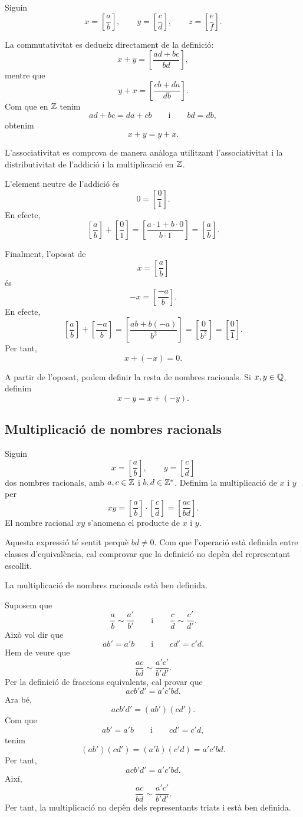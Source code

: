 \begin{prova}
Siguin
\[
	x=\left[\frac{a}{b}\right],
	\qquad
	y=\left[\frac{c}{d}\right],
	\qquad
	z=\left[\frac{e}{f}\right].
\]

La commutativitat es dedueix directament de la definició:
\[
	x+y
	=
	\left[\frac{ad+bc}{bd}\right],
\]
mentre que
\[
	y+x
	=
	\left[\frac{cb+da}{db}\right].
\]
Com que en \(\mathbb{Z}\) tenim
\[
	ad+bc=da+cb
	\qquad\text{i}\qquad
	bd=db,
\]
obtenim
\[
	x+y=y+x.
\]

L'associativitat es comprova de manera anàloga utilitzant l'associativitat i la distributivitat de l'addició i la multiplicació en \(\mathbb{Z}\).

L'element neutre de l'addició és
\[
	0=\left[\frac{0}{1}\right].
\]
En efecte,
\[
	\left[\frac{a}{b}\right]
	+
	\left[\frac{0}{1}\right]
	=
	\left[\frac{a\cdot1+b\cdot0}{b\cdot1}\right]
	=
	\left[\frac{a}{b}\right].
\]

Finalment, l'oposat de
\[
	x=\left[\frac{a}{b}\right]
\]
és
\[
	-x=\left[\frac{-a}{b}\right].
\]
En efecte,
\[
	\left[\frac{a}{b}\right]
	+
	\left[\frac{-a}{b}\right]
	=
	\left[\frac{ab+b(-a)}{b^2}\right]
	=
	\left[\frac{0}{b^2}\right]
	=
	\left[\frac{0}{1}\right].
\]
Per tant,
\[
	x+(-x)=0.
\]
\end{prova}

A partir de l'oposat, podem definir la resta de nombres racionals. Si \(x,y\in\mathbb{Q}\), definim
\[
	x-y=x+(-y).
\]

\subsection{Multiplicació de nombres racionals}

Siguin
\[
	x=\left[\frac{a}{b}\right],
	\qquad
	y=\left[\frac{c}{d}\right]
\]
dos nombres racionals, amb \(a,c\in\mathbb{Z}\) i \(b,d\in\mathbb{Z}^{*}\). Definim la multiplicació de \(x\) i \(y\) per
\[
	xy
	=
	\left[\frac{a}{b}\right]
	\cdot
	\left[\frac{c}{d}\right]
	=
	\left[\frac{ac}{bd}\right].
\]
El nombre racional \(xy\) s'anomena el producte de \(x\) i \(y\).

Aquesta expressió té sentit perquè \(bd\neq0\). Com que l'operació està definida entre classes d'equivalència, cal comprovar que la definició no depèn del representant escollit.

\begin{proposicio}
La multiplicació de nombres racionals està ben definida.
\end{proposicio}

\begin{prova}
Suposem que
\[
	\frac{a}{b}\sim\frac{a'}{b'}
	\qquad\text{i}\qquad
	\frac{c}{d}\sim\frac{c'}{d'}.
\]
Això vol dir que
\[
	ab'=a'b
	\qquad\text{i}\qquad
	cd'=c'd.
\]
Hem de veure que
\[
	\frac{ac}{bd}
	\sim
	\frac{a'c'}{b'd'}.
\]
Per la definició de fraccions equivalents, cal provar que
\[
	acb'd'=a'c'bd.
\]
Ara bé,
\[
	acb'd'
	=
	(ab')(cd').
\]
Com que
\[
	ab'=a'b
	\qquad\text{i}\qquad
	cd'=c'd,
\]
tenim
\[
	(ab')(cd')=(a'b)(c'd)=a'c'bd.
\]
Per tant,
\[
	acb'd'=a'c'bd.
\]
Així,
\[
	\frac{ac}{bd}
	\sim
	\frac{a'c'}{b'd'}.
\]
Per tant, la multiplicació no depèn dels representants triats i està ben definida.
\end{prova}

